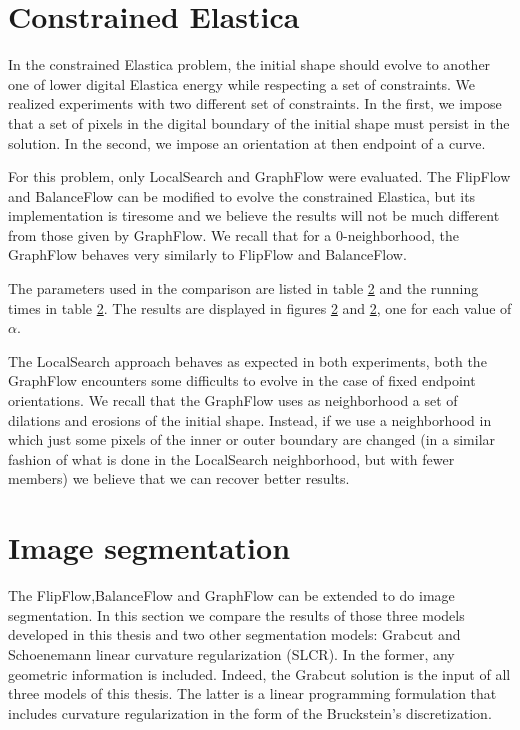 \section{Constrained Elastica}

In the constrained Elastica problem, the initial shape should evolve to another one of lower digital Elastica energy while respecting a set of constraints. We realized experiments with two different set of constraints. In the first, we impose that a set of pixels in the digital boundary of the initial shape must persist in the solution. In the second, we impose an orientation at then endpoint of a curve. 

For this problem, only LocalSearch and GraphFlow were evaluated. The FlipFlow and BalanceFlow can be modified to evolve the constrained Elastica, but its implementation is tiresome and we believe the results will not be much different from those given by GraphFlow. We recall that for a $0$-neighborhood, the GraphFlow behaves very similarly to FlipFlow and BalanceFlow.

The parameters used in the comparison are listed in table \ref{} and the running times in table \ref{}. The results are displayed in figures \ref{} and \ref{}, one for each value of $\alpha$. 

The LocalSearch approach behaves as expected in both experiments, both the GraphFlow encounters some difficults to evolve in the case of fixed endpoint orientations. We recall that the GraphFlow uses as neighborhood a set of dilations and erosions of the initial shape. Instead, if we use a neighborhood in which just some pixels of the inner or outer boundary are changed (in a similar fashion of what is done in the LocalSearch neighborhood, but with fewer members) we believe that we can recover better results.

\section{Image segmentation}

The FlipFlow,BalanceFlow and GraphFlow can be extended to do image segmentation. In this section we compare the results of those three models developed in this thesis and two other segmentation models: Grabcut and Schoenemann linear curvature regularization (SLCR). In the former, any geometric information is included. Indeed, the Grabcut solution is the input of all three models of this thesis. The latter is a linear programming formulation that includes curvature regularization in the form of the Bruckstein's discretization.

